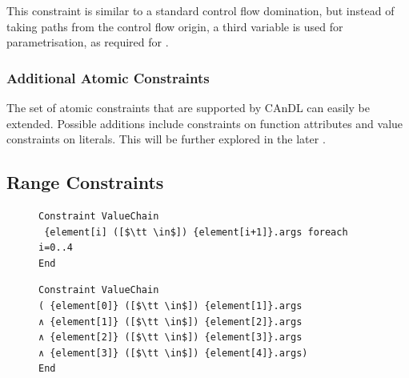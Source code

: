     \noindent
    This constraint is similar to a standard control flow domination, but
    instead of taking paths from the control flow origin, a third variable is
    used for parametrisation, as required for .
    

\subsubsection{Additional Atomic Constraints}

    The set of atomic constraints that are supported by CAnDL can easily be
    extended.
    Possible additions include constraints on function attributes and value
    constraints on literals.
    This will be further explored in the later
    .

\subsection{Range Constraints}

\begin{figure}[t]
\begin{lstlisting}[language=CAnDL]
Constraint ValueChain
 {element[i] ([$\tt \in$]) {element[i+1]}.args foreach i=0..4
End
\end{lstlisting}
\begin{lstlisting}[language=CAnDL,label={fig:forall},caption=
   {Example for the expansion of range constraints in CAnDL:
    The specification at the top can be ``unrolled'' manually, resulting in the
    equivalent, but more verbose, specification below.\parfillskip=0pt}]
Constraint ValueChain
( {element[0]} ([$\tt \in$]) {element[1]}.args
∧ {element[1]} ([$\tt \in$]) {element[2]}.args
∧ {element[2]} ([$\tt \in$]) {element[3]}.args
∧ {element[3]} ([$\tt \in$]) {element[4]}.args)
End
\end{lstlisting}
\end{figure}

